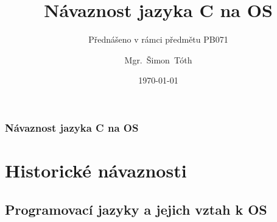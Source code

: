 

\title{Návaznost jazyka C na OS}
\subtitle{Přednášeno v rámci předmětu PB071}
\author[]{Mgr.~Šimon~Tóth}
\date{\today}

\newcommand{\CcNote}[1]{%
        Licencováno pod: \textit{Creative Commons #1 3.0 License}.%
}



\begin{frame}
  \titlepage
\end{frame}

\begin{frame}
  \frametitle{Návaznost jazyka C na OS}
  \tableofcontents
\end{frame}


\section{Historické návaznosti}
\subsection{Programovací jazyky a jejich vztah k OS}

